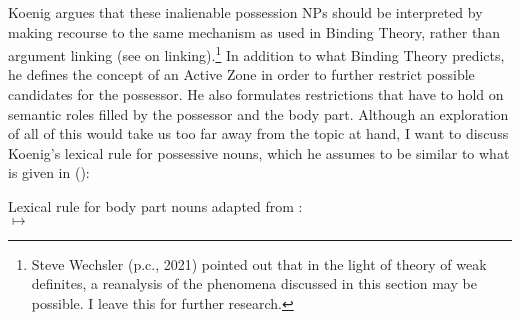 \documentclass[output=paper,biblatex,babelshorthands,newtxmath,draftmode,colorlinks,citecolor=brown]{langscibook}
\begin{document}
Koenig argues that these inalienable possession NPs should be interpreted by making recourse to the
same mechanism as used in Binding Theory, rather than argument linking (see
 on linking).\footnote{\label{fn-non-configurational-BT-SW}%
Steve Wechsler (p.c., 2021) pointed out that in the light of  theory
of weak definites, a reanalysis of the phenomena discussed in this section may be possible. I leave
this for further research.
} In addition to what Binding
Theory predicts, he defines the concept of an Active Zone \citep{Langacker1984a-u} in order to further restrict possible
candidates for the possessor. He also formulates restrictions that have to hold on semantic roles
filled by the possessor and the body part. Although an exploration of all of this would take us too far
away from the topic at hand, I want to discuss Koenig's lexical rule for possessive nouns, which he assumes to be similar to what is given in ():

\ea
Lexical rule for body part nouns adapted from \citet[256]{Koenig1999b}:\\
 $\mapsto$\\
\flushright
{}

\medskip
\z
\end{document}
